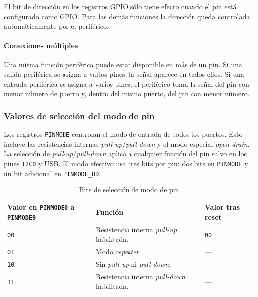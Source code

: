 El bit de dirección en los registros GPIO sólo tiene efecto cuando el pin está configurado como GPIO. Para las demás funciones la dirección queda controlada automáticamente por el periférico.

\paragraph{Conexiones múltiples}
Una misma función periférica puede estar disponible en más de un pin. Si una salida periférica se asigna a varios pines, la señal aparece en todos ellos. Si una entrada periférica se asigna a varios pines, el periférico toma la señal del pin con menor número de puerto y, dentro del mismo puerto, del pin con menor número.



\subsubsection{Valores de selección del modo de pin}
Los registros \texttt{PINMODE} controlan el modo de entrada de todos los puertos. Esto incluye las resistencias internas \textit{pull-up}/\textit{pull-down} y el modo especial \textit{open-drain}. La selección de \textit{pull-up}/\textit{pull-down} aplica a cualquier función del pin salvo en los pines \texttt{I2C0} y USB. El modo efectivo usa tres bits por pin: dos bits en \texttt{PINMODE} y un bit adicional en \texttt{PINMODE\_OD}.

\begin{table}[H]
  \centering
  \small
  \renewcommand{\arraystretch}{1.15}
  \caption{Bits de selección de modo de pin}
  \begin{tabularx}{0.9\textwidth}{|>{\raggedright\arraybackslash}p{}|>{\raggedright\arraybackslash}X|>{\raggedright\arraybackslash}p{}|}
    \hline
    \textbf{Valor en \texttt{PINMODE0} a \texttt{PINMODE9}} & \textbf{Función} & \textbf{Valor tras reset} \\
    \hline
    \texttt{00} & Resistencia interna \textit{pull-up} habilitada. & \texttt{00} \\
    \hline
    \texttt{01} & Modo \textit{repeater}. & --- \\
    \hline
    \texttt{10} & Sin \textit{pull-up} ni \textit{pull-down}. & --- \\
    \hline
    \texttt{11} & Resistencia interna \textit{pull-down} habilitada. & --- \\
    \hline
  \end{tabularx}
\end{table}

